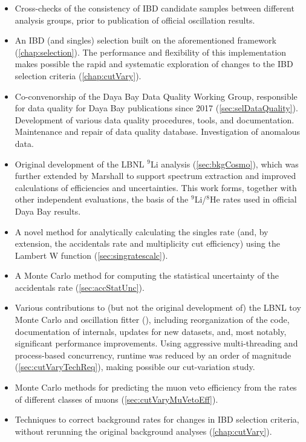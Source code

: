 \documentclass[../thesis.tex]{subfiles}
\begin{document}
\begin{itemize}
  \item Cross-checks of the consistency of IBD candidate samples between different analysis groups, prior to publication of official oscillation results.
  \item An IBD (and singles) selection \cite{IbdSel} built on the aforementioned framework (\autoref{chap:selection}). The performance and flexibility of this implementation makes possible the rapid and systematic exploration of changes to the IBD selection criteria (\autoref{chap:cutVary}).
  \item Co-convenorship of the Daya Bay Data Quality Working Group, responsible for data quality for Daya Bay publications since 2017 (\autoref{sec:selDataQuality}). Development of various data quality procedures, tools, and documentation. Maintenance and repair of data quality database. Investigation of anomalous data.
  \item Original development of the LBNL $^9$Li analysis (\autoref{sec:bkgCosmo}), which was further extended by Marshall \cite{ChrisLi9} to support spectrum extraction and improved calculations of efficiencies and uncertainties. This work forms, together with other independent evaluations, the basis of the $^9$Li/$^8$He rates used in official Daya Bay results.
  \item A novel method for analytically calculating the singles rate (and, by extension, the accidentals rate and multiplicity cut efficiency) using the Lambert W function (\autoref{sec:singratescalc}).
  \item A Monte Carlo method for computing the statistical uncertainty of the accidentals rate (\autoref{sec:accStatUnc}).
  \item Various contributions to (but not the original development of) the LBNL toy Monte Carlo and oscillation fitter (), including reorganization of the code, documentation of internals, updates for new datasets, and, most notably, significant performance improvements. Using aggressive multi-threading and process-based concurrency, runtime was reduced by an order of magnitude (\autoref{sec:cutVaryTechReq}), making possible our cut-variation study.
  \item Monte Carlo methods for predicting the muon veto efficiency from the rates of different classes of muons (\autoref{sec:cutVaryMuVetoEff}).
  \item Techniques to correct background rates for changes in IBD selection criteria, without rerunning the original background analyses (\autoref{chap:cutVary}).

\end{itemize}
\end{document}
